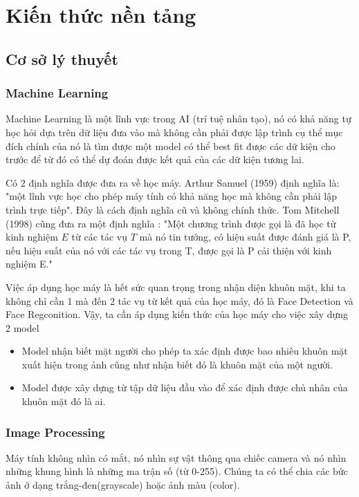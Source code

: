 \documentclass[a4paper]{report}
\begin{document}
\chapter{Kiến thức nền tảng}
\section{Cơ sở lý thuyết}
\subsection{Machine Learning}
Machine Learning là một lĩnh vực trong AI (trí tuệ nhân tạo), nó có khả năng tự học hỏi dựa trên dữ liệu đưa vào mà không cần phải được lập trình cụ thể mục đích chính của nó là tìm được một model có thể best fit được các dữ kiện cho trước để từ đó có thể dự đoán được kết quả của các dữ kiện tương lai.
\par\noindent
Có 2 định nghĩa được đưa ra về học máy. Arthur Samuel (1959) định nghĩa là: "một lĩnh vực học cho phép máy tính có khả năng học mà không cần phải lập trình trực tiếp". Đây là cách định nghĩa cũ và không chính thức. Tom Mitchell (1998) cũng đưa ra một định nghĩa \cite{bib1} : "Một chương trình được gọi là đã học từ kinh nghiệm $E$ từ các tác vụ $T$ mà nó tin tưởng, có hiệu suất được đánh giá là P, nếu hiệu suất của nó với các tác vụ trong T, được gọi là P cải thiện với kinh nghiệm E."
\par\noindent
Việc áp dụng học máy là hết sức quan trọng trong nhận diện khuôn mặt, khi ta không chỉ cần 1 mà đến 2 tác vụ từ kết quả của học máy, đó là Face Detection và Face Regconition. Vậy, ta cần áp dụng kiến thức của học máy cho việc xây dựng 2 model
\par\noindent
\begin{itemize}
\item Model nhận biết mặt người cho phép ta xác định được bao nhiêu khuôn mặt xuất hiện trong ảnh cũng như nhận biết đó là khuôn mặt của một người.
\item Model được xây dựng từ tập dữ liệu đầu vào để xác định được chủ nhân của khuôn mặt đó là ai.
\end{itemize}
\subsection{Image Processing}
Máy tính không nhìn có mắt, nó nhìn sự vật thông qua chiếc camera và nó nhìn những khung hình là những ma trận số (từ 0-255). Chúng ta có thể chia các bức ảnh ở dạng trắng-đen(grayscale) hoặc ảnh màu (color).
\par\noindent
\end{document}

